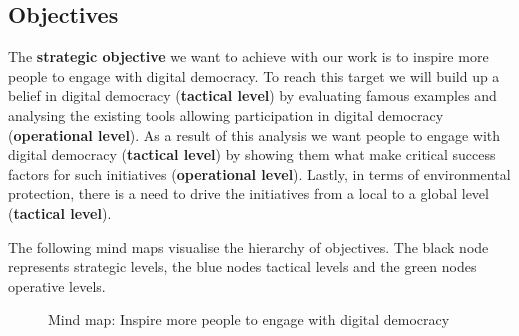\subsection{Objectives}
\label{subsec:objectives}
The \textbf{strategic objective} we want to achieve with our work is to inspire more people to engage with digital democracy. To reach this target we will build up a belief in digital democracy (\textbf{tactical level}) by evaluating famous examples and analysing the existing tools allowing participation in digital democracy (\textbf{operational level}). As a result of this analysis we want people to engage with digital democracy (\textbf{tactical level}) by showing them what make critical success factors for such initiatives (\textbf{operational level}). Lastly, in terms of environmental protection, there is a need to drive the initiatives from a local to a global level (\textbf{tactical level}).\par\vspace{0.2cm}
The following mind maps visualise the hierarchy of objectives. The black node represents strategic levels, the blue nodes tactical levels and the green nodes operative levels. \\
\begin{figure}[H]
\caption{Mind map: Inspire more people to engage with digital democracy}
\end{figure}
